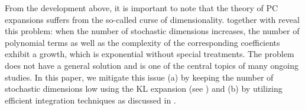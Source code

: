 From the development above, it is important to note that the theory of PC expansions suffers from the so-called curse of dimensionality.
 together with  reveal this problem: when the number of stochastic dimensions increases, the number of polynomial terms as well as the complexity of the corresponding coefficients exhibit a growth, which is exponential without special treatments.
The problem does not have a general solution and is one of the central topics of many ongoing studies.
In this paper, we mitigate this issue (a) by keeping the number of stochastic dimensions low using the KL expansion (see ) and (b) by utilizing efficient integration techniques as discussed in .

